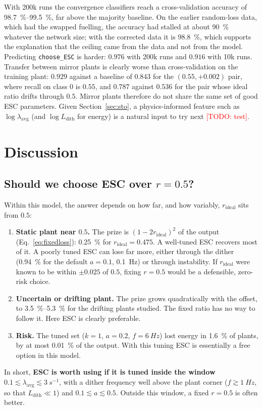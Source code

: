 \documentclass[11pt,a4paper]{article}
\newcommand{\todo}[1]{\textcolor{red}{[TODO: #1]}}
\newcommand{\rid}{r_\mathrm{ideal}}
\newcommand{\lavg}{\lambda_\mathrm{avg}}
\begin{document}
With 200k runs the convergence classifiers reach a cross-validation accuracy of \SIrange{98.7}{99.5}{\percent}, far above the majority baseline. On the earlier random-loss data, which had the swapped fuelling, the accuracy had stalled at about \SI{90}{\percent} whatever the network size; with the corrected data it is \SI{98.8}{\percent}, which supports the explanation that the ceiling came from the data and not from the model. Predicting \texttt{choose\_ESC} is harder: $0.976$ with 200k runs and $0.916$ with 10k runs.
Transfer between mirror plants is clearly worse than cross-validation on the training plant: $0.929$ against a baseline of $0.843$ for the $(0.55,+0.002)$ pair, where recall on class 0 is $0.55$, and $0.787$ against $0.536$ for the pair whose ideal ratio drifts through $0.5$. Mirror plants therefore do not share the same set of good ESC parameters.
Given Section~\ref{sec:sto}, a physics-informed feature such as $\log\lavg$ (and $\log L_\mathrm{dith}$ for energy) is a natural input to try next \todo{test}.

\section{Discussion}
\label{sec:discussion}

\subsection{Should we choose ESC over $r=0.5$?}
Within this model, the answer depends on how far, and how variably, $\rid$ sits from $0.5$:
\begin{enumerate}
  \item \textbf{Static plant near $0.5$.} The prize is $(1-2\rid)^2$ of the output (Eq.~\eqref{eq:fixedloss}): \SI{0.25}{\percent} for $\rid=0.475$. A well-tuned ESC recovers most of it. A poorly tuned ESC can lose far more, either through the dither (\SI{0.94}{\percent} for the default $a=0.1$, \SI{0.1}{Hz}) or through instability. If $\rid$ were known to be within $\pm0.025$ of $0.5$, fixing $r=0.5$ would be a defensible, zero-risk choice.
  \item \textbf{Uncertain or drifting plant.} The prize grows quadratically with the offset, to \SIrange{3.5}{5.3}{\percent} for the drifting plants studied. The fixed ratio has no way to follow it. Here ESC is clearly preferable.
  \item \textbf{Risk.} The tuned set ($k=1$, $a=0.2$, $f=\SI{6}{Hz}$) lost energy in \SI{1.6}{\percent} of plants, by at most \SI{0.01}{\percent} of the output. With this tuning ESC is essentially a free option in this model.
\end{enumerate}
In short, \textbf{ESC is worth using if it is tuned inside the window} $0.1\lesssim\lavg\lesssim\SI{3}{s^{-1}}$, with a dither frequency well above the plant corner ($f\gtrsim\SI{1}{Hz}$, so that $L_\mathrm{dith}\ll1$) and $0.1\lesssim a\lesssim0.5$. Outside this window, a fixed $r=0.5$ is often better.
\end{document}
